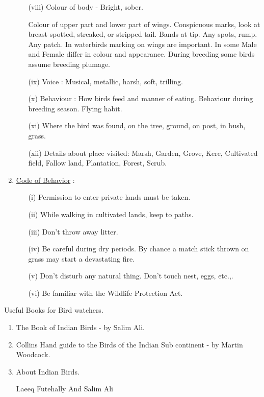 \begin{enumerate}
\begin{itemize}
\item[(viii)] Colour of body - Bright, sober. 

Colour of upper part and lower part of wings. Conspicuous 
marks, look at breast spotted, streaked, or stripped 
tail. Bands at tip. Any spots, rump. Any patch. 
In waterbirds marking on wings are important. In some 
Male and Female differ in colour and appearance. During 
breeding some birds assume breeding plumage. 

\item[(ix)] Voice : Musical, metallic, harsh, soft, trilling. 

\item[(x)] Behaviour : How birds feed and manner of eating. Behaviour 
during breeding season. Flying habit. 

\item[(xi)] Where the bird was found, on the tree, ground, on post, in 
bush, grass. 

\item[(xii)] Details about place visited: Marsh, Garden, Grove, 
Kere, Cultivated field, Fallow land, Plantation, Forest, 
Scrub. 
\end{itemize}

\item \underline{Code of Behavior} : 
\begin{itemize}
\item[(i)] Permission to enter private lands must be taken. 

\item[(ii)] While walking in cultivated lands, keep to paths. 

\item[(iii)] Don't throw away litter. 

\item[(iv)] Be careful during dry periods. By chance a match stick 
thrown on grass may start a devastating fire. 

\item[(v)] Don't disturb any natural thing. Don't touch nest, eggs, 
etc.,.

\item[(vi)] Be familiar with the Wildlife Protection Act. 
\end{itemize}
\end{enumerate}

Useful Books for Bird watchers. 
\begin{enumerate}
\item The Book of Indian Birds - by Salim Ali. 

\item Collins Hand guide to the Birds of the Indian Sub continent - by Martin Woodcock. 

\item About Indian Birds. 

Laeeq Futehally And Salim Ali 
\end{enumerate}

